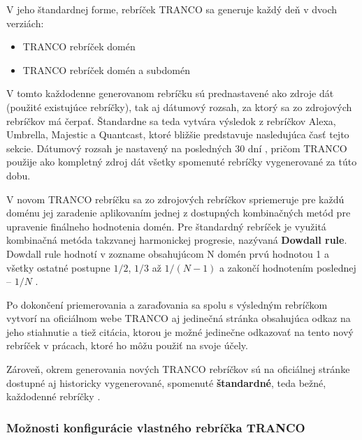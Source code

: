 V jeho štandardnej forme, rebríček TRANCO sa generuje každý deň v dvoch verziách:
\begin{itemize}
    \item TRANCO rebríček domén
    \item TRANCO rebríček domén a subdomén
\end{itemize}

\pagebreak

V tomto každodenne generovanom rebríčku sú prednastavené ako zdroje dát (použité existujúce rebríčky), tak aj dátumový rozsah, za ktorý sa zo zdrojových rebríčkov má čerpať.
Štandardne sa teda vytvára výsledok z rebríčkov Alexa, Umbrella, Majestic a Quantcast, ktoré bližšie predstavuje nasledujúca časť tejto sekcie. 
Dátumový rozsah je nastavený na posledných 30 dní \cite{tranco-github}, pričom TRANCO použije ako kompletný zdroj dát všetky spomenuté rebríčky vygenerované za túto dobu. 

V novom TRANCO rebríčku sa zo zdrojových rebríčkov spriemeruje pre každú doménu jej zaradenie aplikovaním jednej z dostupných kombinačných metód pre upravenie finálneho hodnotenia domén.
Pre štandardný rebríček je využitá kombinačná metóda takzvanej harmonickej progresie, nazývaná \textbf{Dowdall rule}. Dowdall rule hodnotí v zozname obsahujúcom N domén prvú hodnotou 1 a všetky ostatné postupne \(1/2\), \(1/3\) až \(1/(N-1)\) a zakončí hodnotením poslednej -- \(1/N\) \cite{tranco, tranco-homepage}.


Po dokončení priemerovania a zaraďovania sa spolu s výsledným rebríčkom vytvorí na oficiálnom webe TRANCO aj jedinečná stránka obsahujúca odkaz na jeho stiahnutie a tiež citácia, 
ktorou je možné jedinečne odkazovať na tento nový rebríček v prácach, ktoré ho môžu použiť na svoje účely.

Zároveň, okrem generovania nových TRANCO rebríčkov sú na oficiálnej stránke dostupné aj historicky vygenerované, spomenuté \textbf{štandardné}, teda bežné, každodenné rebríčky \cite{tranco-homepage}.




\subsubsection{Možnosti konfigurácie vlastného rebríčka TRANCO}
\label{tranco-config}

